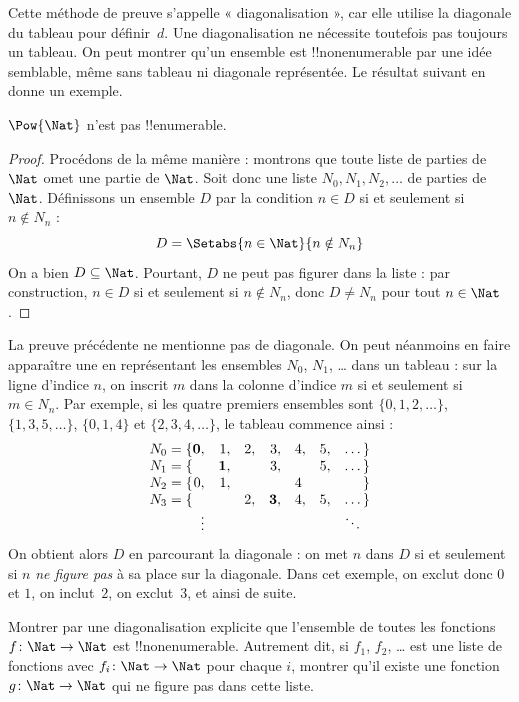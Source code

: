 \documentclass[../../../include/open-logic-section]{subfiles}
\begin{document}
\begin{explain}
Cette méthode de preuve s'appelle « diagonalisation », car elle
utilise la diagonale du tableau pour définir~$d$. Une diagonalisation
ne nécessite toutefois pas toujours un tableau. On peut montrer
qu'un ensemble est !!{nonenumerable} par une idée semblable,
même sans tableau ni diagonale représentée. Le résultat suivant
en donne un exemple.
\end{explain}

\begin{thm}
$\Pow{\Nat}$ n'est pas !!{enumerable}.
\end{thm}

\begin{proof}
Procédons de la même manière : montrons que toute liste de parties
de~$\Nat$ omet une partie de $\Nat$. Soit donc une liste
$N_0, N_1, N_2, \ldots$ de parties de $\Nat$. Définissons
un ensemble $D$ par la condition $n \in D$ si et seulement si
$n \notin N_n$ :
\[
D = \Setabs{n \in \Nat}{n \notin N_n}
\]
On a bien $D\subseteq \Nat$. Pourtant, $D$ ne peut pas figurer
dans la liste : par construction, $n \in D$ si et seulement si
$n\notin N_n$, donc $D \neq N_n$ pour tout $n \in \Nat$.
\end{proof}

\begin{explain}
La preuve précédente ne mentionne pas de diagonale. On peut
néanmoins en faire apparaître une en représentant les ensembles
$N_0$, $N_1$, \dots{} dans un tableau : sur la ligne d'indice $n$,
on inscrit $m$ dans la colonne d'indice $m$ si et seulement si
$m \in N_n$. Par exemple, si les quatre premiers ensembles sont
$\{0,1,2,\dots\}$, $\{1, 3, 5, \dots\}$, $\{0,1,4\}$ et
$\{2,3,4,\dots\}$, le tableau commence ainsi :
\[
\begin{array}{r@{}rrrrrrr}
  N_0 = \{ & \mathbf{0}, & 1, & 2, & 3, & 4, & 5, & \dots\}\\
  N_1 = \{ &  & \mathbf{1}, &  & 3, &  & 5, & \dots\}\\
  N_2 = \{ & 0, & 1, &  &  & 4\phantom{,} &  & \}\\
  N_3 = \{ &  &  & 2, & \mathbf{3}, & 4, & 5, & \dots\}\\
  &\vdots & & & & & & \ddots\phantom{\}}
\end{array}
\]
%
%
%
%
%
On obtient alors $D$ en parcourant la diagonale : on met $n$
dans $D$ si et seulement si $n$ \emph{ne figure pas} à sa place
sur la diagonale. Dans cet exemple, on exclut donc $0$ et $1$,
on inclut~$2$, on exclut~$3$, et ainsi de suite.
\end{explain}

\begin{prob}
Montrer par une diagonalisation explicite que l'ensemble de toutes
les fonctions $f \colon \Nat \to \Nat$ est !!{nonenumerable}.
Autrement dit, si $f_1$, $f_2$, \dots{} est une liste de fonctions
avec $f_i\colon \Nat \to \Nat$ pour chaque $i$, montrer qu'il
existe une fonction $g \colon \Nat \to \Nat$ qui ne figure
pas dans cette liste.
\end{prob}
\end{document}
